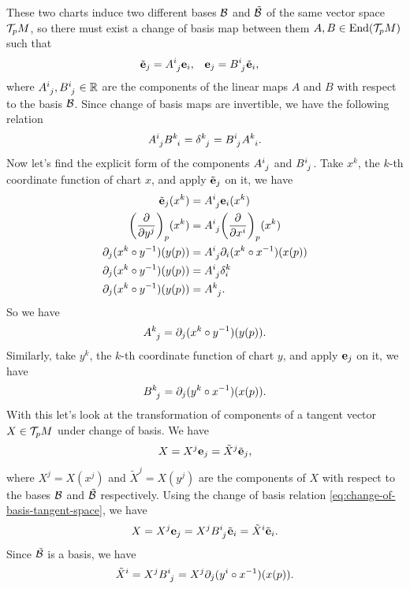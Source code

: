 These two charts induce two different bases \(\mathcal B\) and \(\tilde{\mathcal B}\) of the same vector space \(\mathcal T_p M\), so there must exist a change of basis map between them \(A, B \in \operatorname{End}(\mathcal T_p M)\) such that
\begin{align} \label{eq:change-of-basis-tangent-space}
	\tilde{\vb{e}}_j & = \tensor{A}{^i_j} \vb{e}_i, & \vb{e}_j & = \tensor{B}{^i_j} \tilde{\vb{e}}_i,
\end{align}
where \(\tensor{A}{^i_j}, \tensor{B}{^i_j} \in \R\) are the components of the linear maps \(A\) and \(B\) with respect to the basis \(\mathcal B\). Since change of basis maps are invertible, we have the following relation
\begin{equation}
	\tensor{A}{^i_j} \tensor{B}{^k_i} = \tensor{\delta}{^k_j} = \tensor{B}{^i_j} \tensor{A}{^k_i}.
\end{equation}
Now let's find the explicit form of the components \(\tensor{A}{^i_j}\) and \(\tensor{B}{^i_j}\). Take \(x^k\), the \(k\)-th coordinate function of chart \(x\), and apply \(\tilde{\vb{e}}_j\) on it, we have
\begin{align*}
	\tilde{\vb{e}}_j(x^k)               & = \tensor{A}{^i_j} \vb{e}_i(x^k)                       \\
	\qty(\pdv{y^j})_p (x^k)             & = \tensor{A}{^i_j} \qty(\pdv{x^i})_p (x^k)             \\
	\partial_j (x^k \circ y^{-1})(y(p)) & = \tensor{A}{^i_j} \partial_i (x^k \circ x^{-1})(x(p)) \\
	\partial_j (x^k \circ y^{-1})(y(p)) & = \tensor{A}{^i_j} \delta_i^k                          \\
	\partial_j (x^k \circ y^{-1})(y(p)) & = \tensor{A}{^k_j}.
\end{align*}
So we have
\begin{equation}
	\tensor{A}{^k_j} = \partial_j (x^k \circ y^{-1})(y(p)).
\end{equation}
Similarly, take \(y^k\), the \(k\)-th coordinate function of chart \(y\), and apply \(\vb{e}_j\) on it, we have
\begin{equation}
	\tensor{B}{^k_j} = \partial_j (y^k \circ x^{-1})(x(p)).
\end{equation}
With this let's look at the transformation of components of a tangent vector \(X \in \mathcal T_p M\) under change of basis. We have
\begin{equation}
	X = X^j \vb{e}_j = \tilde{X}^j \tilde{\vb{e}}_j,
\end{equation}
where \(X^j = X(x^j)\) and \(\tilde{X}^j = X(y^j)\) are the components of \(X\) with respect to the bases \(\mathcal B\) and \(\tilde{\mathcal B}\) respectively. Using the change of basis relation \eqref{eq:change-of-basis-tangent-space}, we have
\begin{equation*}
	X = X^j \vb{e}_j = X^j \tensor{B}{^i_j} \tilde{\vb{e}}_i = \tilde{X}^i \tilde{\vb{e}}_i.
\end{equation*}
Since \(\tilde{\mathcal B}\) is a basis, we have
\begin{equation}
	\tilde{X}^i = X^j \tensor{B}{^i_j} = X^j \partial_j (y^i \circ x^{-1})(x(p)).
\end{equation}

